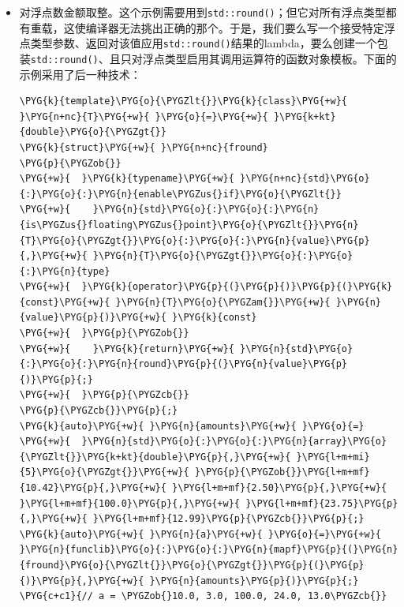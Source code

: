 \begin{itemize}

\item 对浮点数金额取整。这个示例需要用到\texttt{std::\allowbreak{}round()}；但它对所有浮点类型都有重载，这使编译器无法挑出正确的那个。于是，我们要么写一个接受特定浮点类型参数、返回对该值应用\texttt{std::\allowbreak{}round()}结果的lambda，要么创建一个包装\texttt{std::\allowbreak{}round()}、且只对浮点类型启用其调用运算符的函数对象模板。下面的示例采用了后一种技术：



\begin{codeblockbg}
\begin{Verbatim}[commandchars=\\\{\},breaklines=true,breakanywhere=true,fontsize=\codefont,xleftmargin=17bp]
\PYG{k}{template}\PYG{o}{\PYGZlt{}}\PYG{k}{class}\PYG{+w}{ }\PYG{n+nc}{T}\PYG{+w}{ }\PYG{o}{=}\PYG{+w}{ }\PYG{k+kt}{double}\PYG{o}{\PYGZgt{}}
\PYG{k}{struct}\PYG{+w}{ }\PYG{n+nc}{fround}
\PYG{p}{\PYGZob{}}
\PYG{+w}{  }\PYG{k}{typename}\PYG{+w}{ }\PYG{n+nc}{std}\PYG{o}{:}\PYG{o}{:}\PYG{n}{enable\PYGZus{}if}\PYG{o}{\PYGZlt{}}
\PYG{+w}{    }\PYG{n}{std}\PYG{o}{:}\PYG{o}{:}\PYG{n}{is\PYGZus{}floating\PYGZus{}point}\PYG{o}{\PYGZlt{}}\PYG{n}{T}\PYG{o}{\PYGZgt{}}\PYG{o}{:}\PYG{o}{:}\PYG{n}{value}\PYG{p}{,}\PYG{+w}{ }\PYG{n}{T}\PYG{o}{\PYGZgt{}}\PYG{o}{:}\PYG{o}{:}\PYG{n}{type}
\PYG{+w}{  }\PYG{k}{operator}\PYG{p}{(}\PYG{p}{)}\PYG{p}{(}\PYG{k}{const}\PYG{+w}{ }\PYG{n}{T}\PYG{o}{\PYGZam{}}\PYG{+w}{ }\PYG{n}{value}\PYG{p}{)}\PYG{+w}{ }\PYG{k}{const}
\PYG{+w}{  }\PYG{p}{\PYGZob{}}
\PYG{+w}{    }\PYG{k}{return}\PYG{+w}{ }\PYG{n}{std}\PYG{o}{:}\PYG{o}{:}\PYG{n}{round}\PYG{p}{(}\PYG{n}{value}\PYG{p}{)}\PYG{p}{;}
\PYG{+w}{  }\PYG{p}{\PYGZcb{}}
\PYG{p}{\PYGZcb{}}\PYG{p}{;}
\PYG{k}{auto}\PYG{+w}{ }\PYG{n}{amounts}\PYG{+w}{ }\PYG{o}{=}
\PYG{+w}{  }\PYG{n}{std}\PYG{o}{:}\PYG{o}{:}\PYG{n}{array}\PYG{o}{\PYGZlt{}}\PYG{k+kt}{double}\PYG{p}{,}\PYG{+w}{ }\PYG{l+m+mi}{5}\PYG{o}{\PYGZgt{}}\PYG{+w}{ }\PYG{p}{\PYGZob{}}\PYG{l+m+mf}{10.42}\PYG{p}{,}\PYG{+w}{ }\PYG{l+m+mf}{2.50}\PYG{p}{,}\PYG{+w}{ }\PYG{l+m+mf}{100.0}\PYG{p}{,}\PYG{+w}{ }\PYG{l+m+mf}{23.75}\PYG{p}{,}\PYG{+w}{ }\PYG{l+m+mf}{12.99}\PYG{p}{\PYGZcb{}}\PYG{p}{;}
\PYG{k}{auto}\PYG{+w}{ }\PYG{n}{a}\PYG{+w}{ }\PYG{o}{=}\PYG{+w}{ }\PYG{n}{funclib}\PYG{o}{:}\PYG{o}{:}\PYG{n}{mapf}\PYG{p}{(}\PYG{n}{fround}\PYG{o}{\PYGZlt{}}\PYG{o}{\PYGZgt{}}\PYG{p}{(}\PYG{p}{)}\PYG{p}{,}\PYG{+w}{ }\PYG{n}{amounts}\PYG{p}{)}\PYG{p}{;}
\PYG{c+c1}{// a = \PYGZob{}10.0, 3.0, 100.0, 24.0, 13.0\PYGZcb{}}
\end{Verbatim}
\end{codeblockbg}



\end{itemize}
